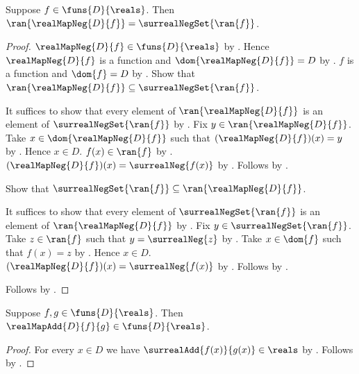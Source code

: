 \begin{proposition}\label{real_map_neg_range}
    Suppose $f\in\funs{D}{\reals}$.
    Then $\ran{\realMapNeg{D}{f}}=\surrealNegSet{\ran{f}}$.
\end{proposition}
\begin{proof}
    $\realMapNeg{D}{f}\in\funs{D}{\reals}$ by
        .
    Hence $\realMapNeg{D}{f}$ is a function and
        $\dom{\realMapNeg{D}{f}}=D$ by
        .
    $f$ is a function and $\dom{f}=D$ by
        .
    Show that $\ran{\realMapNeg{D}{f}}\subseteq
        \surrealNegSet{\ran{f}}$.
    \begin{subproof}
        It suffices to show that every element of
            $\ran{\realMapNeg{D}{f}}$ is an element of
            $\surrealNegSet{\ran{f}}$ by .
        Fix $y\in\ran{\realMapNeg{D}{f}}$.
        Take $x\in\dom{\realMapNeg{D}{f}}$ such that
            $(\realMapNeg{D}{f})(x)=y$ by
            .
        Hence $x\in D$.
        $f(x)\in\ran{f}$ by .
        $(\realMapNeg{D}{f})(x)=\surrealNeg{f(x)}$ by
            .
        Follows by .
    \end{subproof}
    Show that $\surrealNegSet{\ran{f}}\subseteq
        \ran{\realMapNeg{D}{f}}$.
    \begin{subproof}
        It suffices to show that every element of
            $\surrealNegSet{\ran{f}}$ is an element of
            $\ran{\realMapNeg{D}{f}}$ by .
        Fix $y\in\surrealNegSet{\ran{f}}$.
        Take $z\in\ran{f}$ such that $y=\surrealNeg{z}$ by
            .
        Take $x\in\dom{f}$ such that $f(x)=z$ by
            .
        Hence $x\in D$.
        $(\realMapNeg{D}{f})(x)=\surrealNeg{f(x)}$ by
            .
        Follows by .
    \end{subproof}
    Follows by .
\end{proof}

\begin{proposition}\label{real_map_add_type}
    Suppose $f,g\in\funs{D}{\reals}$.
    Then $\realMapAdd{D}{f}{g}\in\funs{D}{\reals}$.
\end{proposition}
\begin{proof}
    For every $x\in D$ we have
        $\surrealAdd{f(x)}{g(x)}\in\reals$
        by .
    Follows by
        .
\end{proof}

